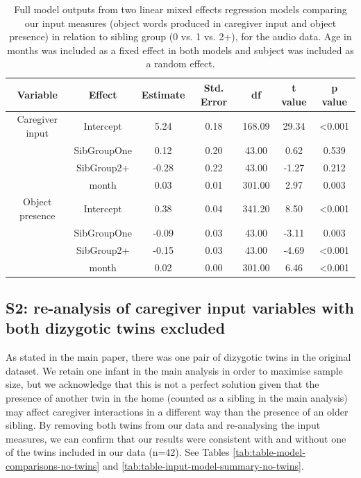 \documentclass[
  man,mask,floatsintext]{apa6}
\begin{document}
\begin{longtable}[t]{ccccccc}
\caption{\label{tab:table-input-model-summary-audio}Full model outputs from two linear mixed effects regression models comparing our input measures (object words produced in caregiver input and object presence) in relation to sibling group (0 vs. 1 vs. 2+), for the audio data. Age in months was included as a fixed effect in both models and subject was included as a random effect.}\\
\toprule
Variable & Effect & Estimate & Std. Error & df & t value & p value\\
\midrule
Caregiver input & Intercept & 5.24 & 0.18 & 168.09 & 29.34 & <0.001\\
 & SibGroupOne & 0.12 & 0.20 & 43.00 & 0.62 & 0.539\\
 & SibGroup2+ & -0.28 & 0.22 & 43.00 & -1.27 & 0.212\\
 & month & 0.03 & 0.01 & 301.00 & 2.97 & 0.003\\
\midrule
Object presence & Intercept & 0.38 & 0.04 & 341.20 & 8.50 & <0.001\\
\addlinespace
 & SibGroupOne & -0.09 & 0.03 & 43.00 & -3.11 & 0.003\\
 & SibGroup2+ & -0.15 & 0.03 & 43.00 & -4.69 & <0.001\\
 & month & 0.02 & 0.00 & 301.00 & 6.46 & <0.001\\
\bottomrule
\end{longtable}

\newpage

\hypertarget{s2-re-analysis-of-caregiver-input-variables-with-both-dizygotic-twins-excluded}{%
\subsection{S2: re-analysis of caregiver input variables with both dizygotic twins excluded}\label{s2-re-analysis-of-caregiver-input-variables-with-both-dizygotic-twins-excluded}}

As stated in the main paper, there was one pair of dizygotic twins in the original dataset. We retain one infant in the main analysis in order to maximise sample size, but we acknowledge that this is not a perfect solution given that the presence of another twin in the home (counted as a sibling in the main analysis) may affect caregiver interactions in a different way than the presence of an older sibling. By removing both twins from our data and re-analysing the input measures, we can confirm that our results were consistent with and without one of the twins included in our data (n=42). See Tables \ref{tab:table-model-comparisons-no-twins} and \ref{tab:table-input-model-summary-no-twins}.
\end{document}
